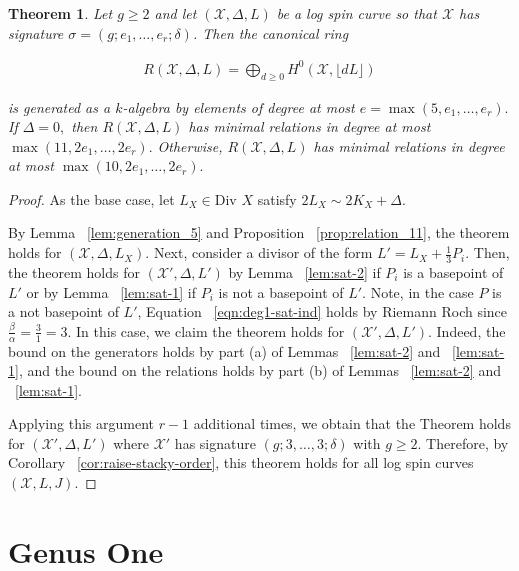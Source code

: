 \documentclass{amsart}
\theoremstyle{plain}
\newtheorem{thm}{Theorem}[section]
\theoremstyle{definition}
\theoremstyle{remark}
\numberwithin{equation}{section}
\newcommand \sx{\mathscr X}
\newcommand \di{\text{Div }}
\newcommand \halfcan{L}
\begin{document}
\begin{thm}
\label{thm:g-high-main}
Let $g \geq 2$ and let $(\sx, \Delta, \halfcan)$ be a log spin curve so
that $\sx$ has signature $\sigma = (g; e_1, \ldots, e_r; \delta)$. Then the
canonical ring

\begin{align*}
	R(\sx, \Delta, \halfcan) = \bigoplus_{d \geq 0} H^0(\sx, \lfloor d L \rfloor)
\end{align*}

\noindent
is generated as a $k$-algebra by elements of degree at most $e =
\max(5, e_1, \ldots, e_r).$ If $\Delta = 0,$ then 
$R(\sx,\Delta, \halfcan)$ has minimal relations in degree at most $\max(11, 2e_1,
\ldots, 2e_r).$ Otherwise, $R(\sx, \Delta, \halfcan)$ has minimal relations in degree at most
$\max(10, 2e_1, \ldots, 2e_r).$
\end{thm}

\begin{proof}
As the base case, let $\halfcan_X \in \di X$ satisfy $2\halfcan_X \sim 2 K_X + \Delta$.

By Lemma ~\ref{lem:generation_5} and Proposition
~\ref{prop:relation_11}, the theorem holds for $(\sx, \Delta,
\halfcan_X)$. Next, consider a divisor of the form $\halfcan' =
\halfcan_X + \frac{1}{3} P_i$. Then, the theorem holds for $(\sx',
\Delta, \halfcan')$ by Lemma ~\ref{lem:sat-2}
 if $P_i$ is a basepoint of $\halfcan'$ or by Lemma
~\ref{lem:sat-1} if $P_i $ is not a basepoint of $L'$. Note,
in the case $P$  is a not basepoint of $\halfcan'$, Equation
~\ref{eqn:deg1-sat-ind} holds by Riemann Roch since $\frac{\beta}{\alpha} = \frac{3}{1}=3$. In this case, we claim the theorem holds for $(\sx',\Delta, L')$. Indeed, the bound on the generators holds by part (a) of Lemmas
~\ref{lem:sat-2} and ~\ref{lem:sat-1},
and the bound on the relations holds by part (b) of Lemmas
~\ref{lem:sat-2} and ~\ref{lem:sat-1}.

Applying this argument $r-1$ additional times, we obtain that the Theorem holds for $(\sx', \Delta, \halfcan')$ where $\sx'$ has signature $(g;3,\ldots, 3;\delta)$ with $g \geq 2$. Therefore, by Corollary 
~\ref{cor:raise-stacky-order}, this theorem 
holds for all log spin curves $(\sx, L, J)$. 
\end{proof}


\section{Genus One}
\label{sec:g_1}
\end{document}
